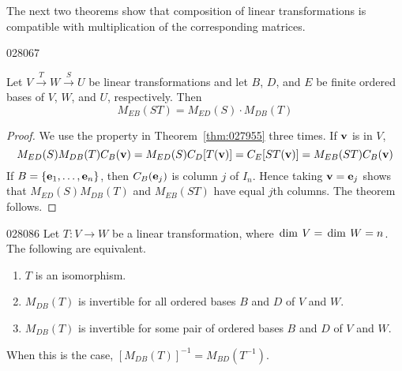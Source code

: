 The next two theorems show that composition of linear transformations is compatible with multiplication of the corresponding matrices.

\begin{theorem}{}{028067}
\begin{wrapfigure}{l}{4cm}
        \vspace*{-1em}
	\centering
	
\end{wrapfigure}	
	
\setlength{\rightskip}{0pt plus 200pt}
Let $V \stackrel{T}{\to} W \stackrel{S}{\to} U$ be linear transformations and let $B$, $D$, and $E$ be finite ordered bases of $V$, $W$, and $U$, respectively. Then
\begin{equation*}
M_{EB}(ST) = M_{ED}(S) \cdot M_{DB}(T)
\end{equation*}
\end{theorem}

\begin{proof}
We use the property in Theorem~\ref{thm:027955} three times. If $\textbf{v}$ is in $V$,
\begin{equation*}
M_{ED}(S)M_{DB}(T)C_B(\textbf{v}) = M_{ED}(S)C_D[T(\textbf{v})] = C_E[ST(\textbf{v})] = M_{EB}(ST)C_B(\textbf{v})
\end{equation*}
If $B = \{\textbf{e}_{1}, \dots, \textbf{e}_{n}\}$, then $C_{B}(\textbf{e}_{j})$ is column $j$ of $I_{n}$. Hence taking $\textbf{v} = \textbf{e}_{j}$ shows that $M_{ED}(S)M_{DB}(T)$ and $M_{EB}(ST)$ have equal $j$th columns. The theorem follows.
\end{proof}

\newpage
\begin{theorem}{}{028086}
Let $T : V \to W$ be a linear transformation, where $\thinspace\operatorname{dim \medspace}V = \thinspace\operatorname{dim \medspace}W = n$. The following are equivalent.
\vspace{-1em}
\begin{enumerate}
\item $T$ is an isomorphism.

\item $M_{DB}(T)$ is invertible for all ordered bases $B$ and $D$ of $V$ and $W$.

\item $M_{DB}(T)$ is invertible for some pair of ordered bases $B$ and $D$ of $V$ and $W$.

\end{enumerate}

When this is the case, $[M_{DB}(T)]^{-1} = M_{BD}(T^{-1})$.
\end{theorem}

